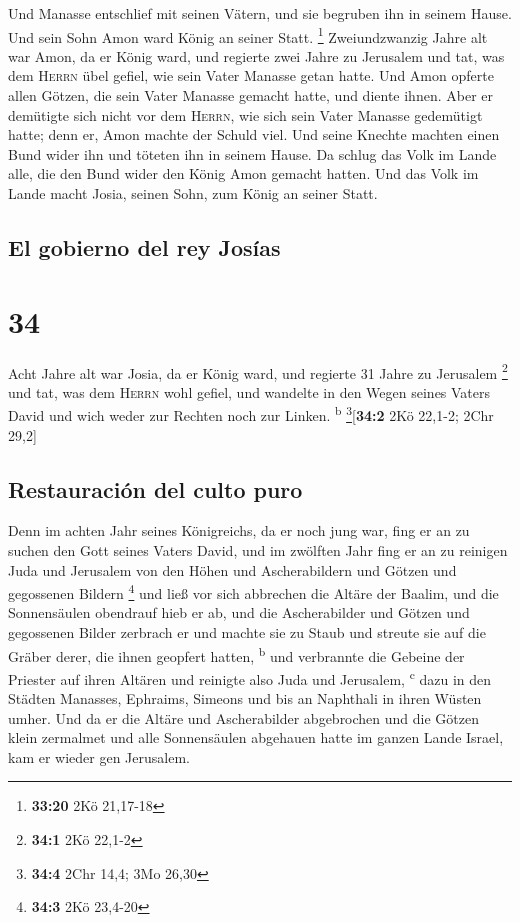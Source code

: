  Und Manasse entschlief mit seinen Vätern, und sie
begruben ihn in seinem Hause. Und sein Sohn Amon ward König an seiner
Statt. \footnote{\textbf{33:20} 2Kö 21,17-18} 
Zweiundzwanzig Jahre alt war Amon, da er König ward, und regierte zwei
Jahre zu Jerusalem  und tat, was dem \textsc{Herrn} übel
gefiel, wie sein Vater Manasse getan hatte. Und Amon opferte allen
Götzen, die sein Vater Manasse gemacht hatte, und diente ihnen.
 Aber er demütigte sich nicht vor dem \textsc{Herrn}, wie
sich sein Vater Manasse gedemütigt hatte; denn er, Amon machte der
Schuld viel.  Und seine Knechte machten einen Bund wider
ihn und töteten ihn in seinem Hause.  Da schlug das Volk
im Lande alle, die den Bund wider den König Amon gemacht hatten. Und das
Volk im Lande macht Josia, seinen Sohn, zum König an seiner Statt.

\hypertarget{el-gobierno-del-rey-josuxedas}{%
\subsection{El gobierno del rey
Josías}\label{el-gobierno-del-rey-josuxedas}}

\hypertarget{section-33}{%
\section{34}\label{section-33}}

 Acht Jahre alt war Josia, da er König ward, und regierte
31 Jahre zu Jerusalem \footnote{\textbf{34:1} 2Kö 22,1-2} 
und tat, was dem \textsc{Herrn} wohl gefiel, und wandelte in den Wegen
seines Vaters David und wich weder zur Rechten noch zur Linken.
\textsuperscript{b} \footnote{\textbf{34:4} 2Chr 14,4; 3Mo 26,30}{[}\textbf{34:2}
2Kö 22,1-2; 2Chr 29,2{]}

\hypertarget{restauraciuxf3n-del-culto-puro}{%
\subsection{Restauración del culto
puro}\label{restauraciuxf3n-del-culto-puro}}

 Denn im achten Jahr seines Königreichs, da er noch jung
war, fing er an zu suchen den Gott seines Vaters David, und im zwölften
Jahr fing er an zu reinigen Juda und Jerusalem von den Höhen und
Ascherabildern und Götzen und gegossenen Bildern \footnote{\textbf{34:3}
  2Kö 23,4-20}  und ließ vor sich abbrechen die Altäre der
Baalim, und die Sonnensäulen obendrauf hieb er ab, und die Ascherabilder
und Götzen und gegossenen Bilder zerbrach er und machte sie zu Staub und
streute sie auf die Gräber derer, die ihnen geopfert hatten,
\textsuperscript{b}  und verbrannte die Gebeine der
Priester auf ihren Altären und reinigte also Juda und Jerusalem,
\textsuperscript{c}  dazu in den Städten Manasses,
Ephraims, Simeons und bis an Naphthali in ihren Wüsten umher.
 Und da er die Altäre und Ascherabilder abgebrochen und
die Götzen klein zermalmet und alle Sonnensäulen abgehauen hatte im
ganzen Lande Israel, kam er wieder gen Jerusalem.

